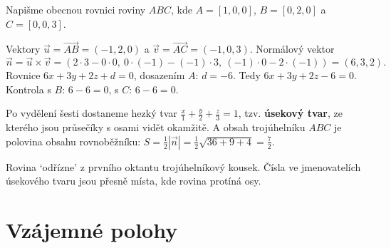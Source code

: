 \begin{example}\label{ex:rovina-tremi-body}
  Napišme obecnou rovnici roviny $ABC$, kde $A = [1, 0, 0]$, $B = [0, 2, 0]$ a $C = [0, 0, 3]$.

  Vektory $\vec{u} = \overrightarrow{AB} = (-1, 2, 0)$ a $\vec{v} = \overrightarrow{AC} = (-1, 0, 3)$. Normálový vektor
  \begin{equation*}
    \vec{n} = \vec{u}\times\vec{v} = (2\cdot 3 - 0\cdot 0,\ 0\cdot(-1) - (-1)\cdot 3,\ (-1)\cdot 0 - 2\cdot(-1)) = (6, 3, 2).
  \end{equation*}
  Rovnice $6x + 3y + 2z + d = 0$, dosazením $A$: $d = -6$. Tedy $6x + 3y + 2z - 6 = 0$. Kontrola s $B$: $6 - 6 = 0$, s $C$: $6 - 6 = 0$.

  Po vydělení šesti dostaneme hezký tvar $\frac{x}{1} + \frac{y}{2} + \frac{z}{3} = 1$, tzv. \textbf{úsekový tvar}, ze kterého jsou průsečíky s osami vidět okamžitě. A obsah trojúhelníku $ABC$ je polovina obsahu rovnoběžníku: $S = \frac{1}{2}|\vec{n}| = \frac{1}{2}\sqrt{36 + 9 + 4} = \frac{7}{2}$.
\end{example}

\begin{center}
\end{center}
Rovina `odřízne' z prvního oktantu trojúhelníkový kousek. Čísla ve jmenovatelích úsekového tvaru jsou přesně místa, kde rovina protíná osy.

\section{Vzájemné polohy}\label{sec:vzajemne-polohy-prostor}

